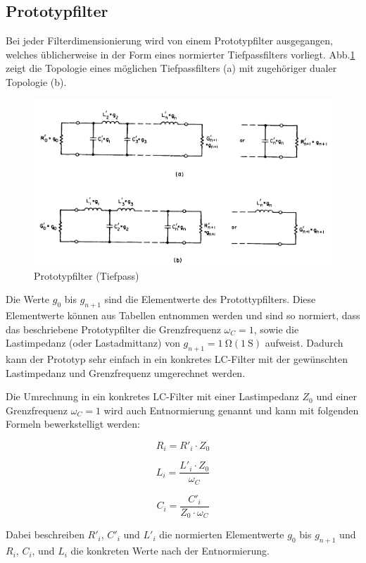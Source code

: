\subsection{Prototypfilter}
\label{sec:Protototypfilter}

Bei jeder Filterdimensionierung wird von einem Prototypfilter ausgegangen, welches üblicherweise in der Form eines normierter Tiefpassfilters vorliegt. Abb.\ref{fig:Prototyp_Filter} zeigt die Topologie eines möglichen Tiefpassfilters (a) mit zugehöriger dualer Topologie (b).

\begin{figure}[h!]
\centering
 	\includegraphics[width=\imagewidth]{images/Prototyp_Filter}
 	\caption{Prototypfilter (Tiefpass)}
 	\label{fig:Prototyp_Filter}
\end{figure}

\cite[p.~95]{ref:matthaei}

Die Werte $g_0$ bis $g_{n+1}$ sind die Elementwerte des Protottypfilters. Diese Elementwerte können aus Tabellen entnommen werden und sind so normiert, dass das beschriebene  Prototypfilter die Grenzfrequenz $\omega_{C} = 1$, sowie die Lastimpedanz (oder Lastadmittanz) von $g_{n+1}=\SI{1}{\ohm} (\SI{1}{\siemens})$ aufweist. Dadurch kann der Prototyp sehr einfach in ein konkretes LC-Filter mit der gewünschten Lastimpedanz und Grenzfrequenz umgerechnet werden. 

Die Umrechnung in ein konkretes LC-Filter mit einer Lastimpedanz $Z_0$ und einer Grenzfrequenz $\omega_{C} = 1$ wird auch Entnormierung genannt und kann mit folgenden Formeln bewerkstelligt werden: 

\begin{equation}\label{eq:R}	
R_i = R'_i \cdot Z_0
\end{equation}

\begin{equation}\label{eq:L}	
L_i = \frac{L'_i \cdot Z_0}{\omega_{C}}
\end{equation}

\begin{equation}\label{eq:C}	
C_i = \frac{C'_i}{Z_0 \cdot \omega_{C}}
\end{equation}

Dabei beschreiben  $R'_i$, $C'_i$ und $L'_i$ die normierten Elementwerte  $g_0$ bis $g_{n+1}$ und $R_i$, $C_i$, und $L_i$ die konkreten Werte nach der Entnormierung.
